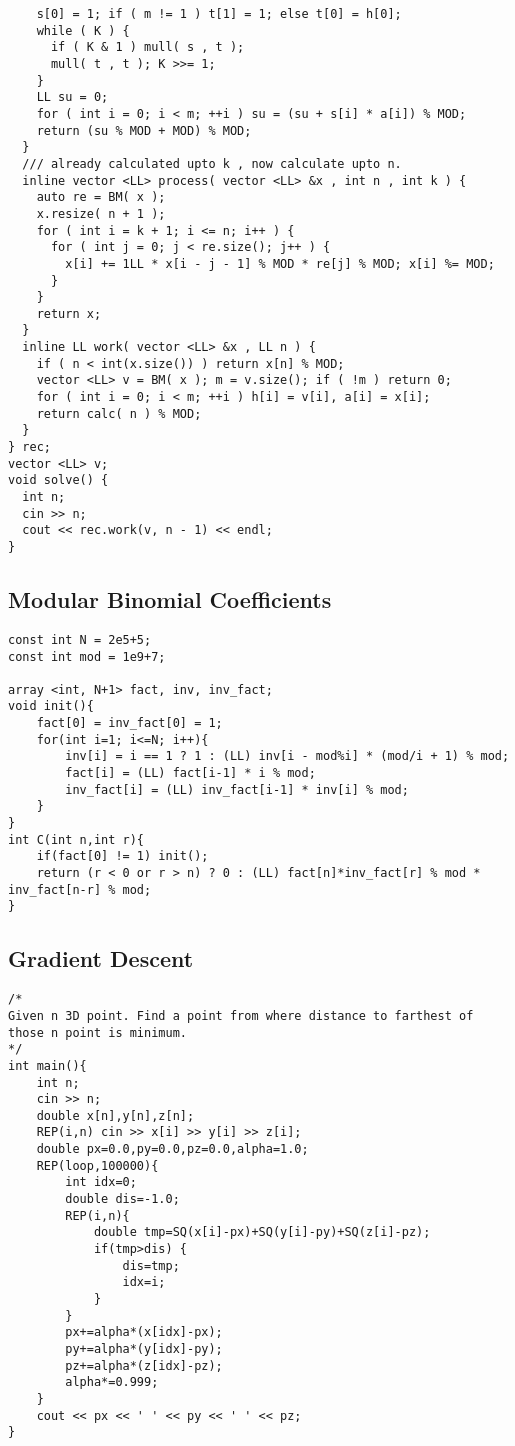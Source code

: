 \documentclass[10pt,a4paper,onesided]{article}
\begin{document}
\begin{multicols*}{3}
\begin{lstlisting}
    s[0] = 1; if ( m != 1 ) t[1] = 1; else t[0] = h[0];
    while ( K ) {
      if ( K & 1 ) mull( s , t );
      mull( t , t ); K >>= 1;
    }
    LL su = 0;
    for ( int i = 0; i < m; ++i ) su = (su + s[i] * a[i]) % MOD;
    return (su % MOD + MOD) % MOD;
  }
  /// already calculated upto k , now calculate upto n.
  inline vector <LL> process( vector <LL> &x , int n , int k ) {
    auto re = BM( x );
    x.resize( n + 1 );
    for ( int i = k + 1; i <= n; i++ ) {
      for ( int j = 0; j < re.size(); j++ ) {
        x[i] += 1LL * x[i - j - 1] % MOD * re[j] % MOD; x[i] %= MOD;
      }
    }
    return x;
  }
  inline LL work( vector <LL> &x , LL n ) {
    if ( n < int(x.size()) ) return x[n] % MOD;
    vector <LL> v = BM( x ); m = v.size(); if ( !m ) return 0;
    for ( int i = 0; i < m; ++i ) h[i] = v[i], a[i] = x[i];
    return calc( n ) % MOD;
  }
} rec;
vector <LL> v;
void solve() {
  int n;
  cin >> n;
  cout << rec.work(v, n - 1) << endl;
}

\end{lstlisting}
\subsection{Modular Binomial Coefficients}
\begin{lstlisting}
const int N = 2e5+5;
const int mod = 1e9+7;

array <int, N+1> fact, inv, inv_fact;
void init(){
    fact[0] = inv_fact[0] = 1;
    for(int i=1; i<=N; i++){
        inv[i] = i == 1 ? 1 : (LL) inv[i - mod%i] * (mod/i + 1) % mod;
        fact[i] = (LL) fact[i-1] * i % mod;
        inv_fact[i] = (LL) inv_fact[i-1] * inv[i] % mod;
    }
}
int C(int n,int r){
    if(fact[0] != 1) init();
    return (r < 0 or r > n) ? 0 : (LL) fact[n]*inv_fact[r] % mod * inv_fact[n-r] % mod;
}
\end{lstlisting}
\subsection{Gradient Descent}
\begin{lstlisting}
/*
Given n 3D point. Find a point from where distance to farthest of those n point is minimum.
*/
int main(){
    int n;
    cin >> n;
    double x[n],y[n],z[n];
    REP(i,n) cin >> x[i] >> y[i] >> z[i];
    double px=0.0,py=0.0,pz=0.0,alpha=1.0;
    REP(loop,100000){
        int idx=0;
        double dis=-1.0;
        REP(i,n){
            double tmp=SQ(x[i]-px)+SQ(y[i]-py)+SQ(z[i]-pz);
            if(tmp>dis) {
                dis=tmp;
                idx=i;
            }
        }
        px+=alpha*(x[idx]-px);
        py+=alpha*(y[idx]-py);
        pz+=alpha*(z[idx]-pz);
        alpha*=0.999;
    }
    cout << px << ' ' << py << ' ' << pz;
}
\end{lstlisting}

\end{multicols*}
\end{document}
